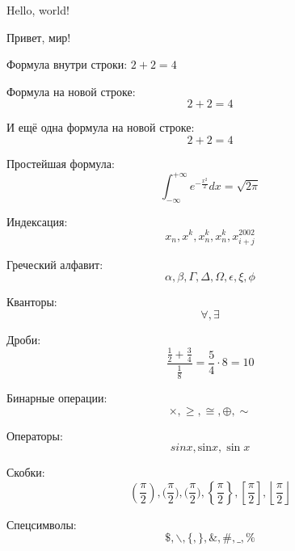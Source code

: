 




    Hello, world!
    
    Привет, мир!

    Формула внутри строки: $2 + 2 = 4$

    Формула на новой строке: \[2 + 2 = 4\]

    И ещё одна формула на новой строке: $$2 + 2 = 4$$

    Простейшая формула:
    \[\int_{-\infty}^{+\infty} e^{-\frac{x^2}{2}}dx = \sqrt{2 \pi}\]

    Индексация:
    \[x_n, x^k, x_n^k, x^k_n, x_{i + j}^{2002}\]

    Греческий алфавит:
    \[\alpha, \beta, \Gamma, \Delta, \Omega, \epsilon, \xi, \phi\]

    Кванторы:
    \[\forall, \exists\]

    Дроби:
    \[\frac{\frac{1}{2} + \frac34}{\frac{1}{8}} = \frac54 \cdot 8 = 10\]

    Бинарные операции:
    \[\times, \ge, \cong, \oplus, \sim\]

    Операторы:
    \[sin x, \mathrm{sin}{x}, \sin{x}\]

    Скобки:
    \[(\frac{\pi}{2}),
    \big( \frac{\pi}{2} \big),
    \bigg( \frac{\pi}{2} \bigg),
    \left\{ \frac{\pi}{2} \right\},
    \left[ \frac{\pi}{2} \right],
    \left\lfloor \frac{\pi}{2} \right\rfloor\]

    Спецсимволы:
    \[\$, \backslash, \{, \}, \&, \#, \_, \%\]



